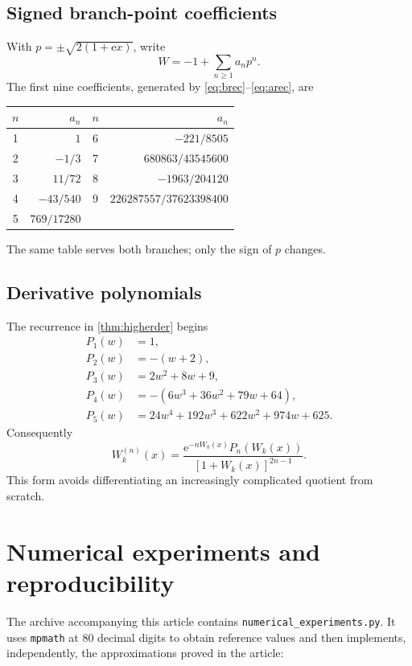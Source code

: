 \documentclass[11pt]{article}
\theoremstyle{remark}
\newcommand{\ee}{\mathrm e}
\begin{document}
\subsection{Signed branch-point coefficients}

With \(p=\pm\sqrt{2(1+\ee x)}\), write
\[
       W=-1+\sum_{n\geq1}a_np^n.
\]
The first nine coefficients, generated by
\eqref{eq:brec}--\eqref{eq:arec}, are
\begin{center}
\begin{tabular}{@{}c r@{\qquad}c r@{}}
\toprule
\(n\)&\(a_n\)&\(n\)&\(a_n\)\\
\midrule
1&\(1\)&6&\(-221/8505\)\\
2&\(-1/3\)&7&\(680863/43545600\)\\
3&\(11/72\)&8&\(-1963/204120\)\\
4&\(-43/540\)&9&\(226287557/37623398400\)\\
5&\(769/17280\)&&\\
\bottomrule
\end{tabular}
\end{center}
The same table serves both branches; only the sign of \(p\) changes.

\subsection{Derivative polynomials}

The recurrence in \cref{thm:higherder} begins
\begin{align*}
 P_1(w)&=1,\\
 P_2(w)&=-(w+2),\\
 P_3(w)&=2w^2+8w+9,\\
 P_4(w)&=-(6w^3+36w^2+79w+64),\\
 P_5(w)&=24w^4+192w^3+622w^2+974w+625.
\end{align*}
Consequently
\[
 W_k^{(n)}(x)
 =\frac{\ee^{-nW_k(x)}P_n(W_k(x))}
       {[1+W_k(x)]^{2n-1}}.
\]
This form avoids differentiating an increasingly complicated quotient from
scratch.

\section{Numerical experiments and reproducibility}\label{app:numerics}

The archive accompanying this article contains
\texttt{numerical\_experiments.py}.  It uses
\texttt{mpmath} at 80 decimal digits to obtain reference values and then
implements, independently, the approximations proved in the article:
\end{document}
